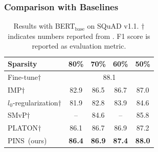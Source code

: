 \subsubsection{Comparison with Baselines}

\begin{table}[t]
	\centering
	\small
	\begin{tabular}{l|cccc}
		\toprule
		Sparsity   & 80\% & 70\% & 60\% & 50\% \\
		\midrule
		Fine-tune$\dagger$  & \multicolumn{4}{c}{88.1}  \\
		\midrule
		IMP$\dagger$        & 82.9 & 86.5 & 86.7 & 87.0 \\
		$l_0$-regularization$\dagger$      & 81.9 & 82.8 & 83.9 & 84.6 \\
		SMvP$\dagger$       & --& 84.6 & -- & 85.8 \\
		PLATON$\dagger$     & 86.1 & 86.7 & 86.9 & 87.2 \\
		\midrule
		PINS~(ours) & \textbf{86.4} & \textbf{86.9} & \textbf{87.4} & \textbf{88.0} \\
		\bottomrule
	\end{tabular}
	\caption{Results with BERT$_{\text{base}}$ on SQuAD v1.1. $\dagger$ indicates numbers reported from \citet{platon}. F1 score is reported as evaluation metric.}
	\label{table:qa}
\end{table}
